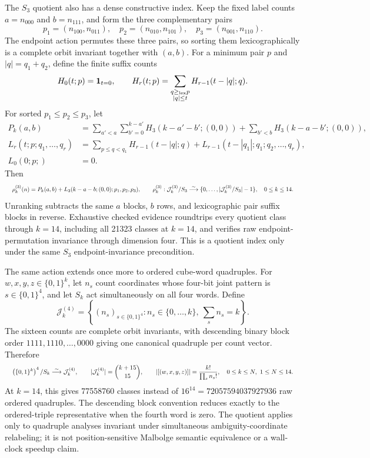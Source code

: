 \documentclass{article}
\newcommand{\fitmath}[1]{\resizebox{0.99\linewidth}{!}{$\displaystyle #1$}}
\begin{document}
The $S_3$ quotient also has a dense constructive index. Keep the fixed label
counts $a=n_{000}$ and $b=n_{111}$, and form the three complementary pairs
\[
  p_1=(n_{100},n_{011}),\quad
  p_2=(n_{010},n_{101}),\quad
  p_3=(n_{001},n_{110}).
\]
The endpoint action permutes these three pairs, so sorting them
lexicographically is a complete orbit invariant together with $(a,b)$. For a
minimum pair $p$ and $|q|=q_1+q_2$, define the finite suffix counts
\[
  H_0(t;p)=\mathbf 1_{t=0},\qquad
  H_r(t;p)=\sum_{\substack{q\geq_{\rm lex}p\\ |q|\leq t}}
    H_{r-1}(t-|q|;q).
\]
For sorted $p_1\leq p_2\leq p_3$, let
\[
  \begin{aligned}
  P_k(a,b)&=\sum_{a'<a}\sum_{b'=0}^{k-a'}H_3(k-a'-b';(0,0))
    +\sum_{b'<b}H_3(k-a-b';(0,0)),\\
  L_r(t;p;q_1,\ldots,q_r)&=
    \sum_{p\leq q<q_1}H_{r-1}(t-|q|;q)
    +L_{r-1}(t-|q_1|;q_1;q_2,\ldots,q_r),\\
  L_0(0;p;)&=0.
  \end{aligned}
\]
Then
\begin{equation}
  \fitmath{%
    \rho^{(3)}_k(n)=P_k(a,b)+L_3(k-a-b;(0,0);p_1,p_2,p_3),
    \qquad
    \rho^{(3)}_k:
      \mathcal J^{(3)}_k/S_3\overset{\sim}{\longrightarrow}
      \{0,\ldots,|\mathcal J^{(3)}_k/S_3|-1\},
    \quad 0\leq k\leq14.
  }
  \label{eq:optimization-crazy-preimage-cube-unordered-triple-ranking}
\end{equation}
Unranking subtracts the same $a$ blocks, $b$ rows, and lexicographic pair
suffix blocks in reverse. Exhaustive checked evidence roundtrips every quotient
class through $k=14$, including all 21323 classes at $k=14$, and verifies raw
endpoint-permutation invariance through dimension four. This is a quotient
index only under the same $S_3$ endpoint-invariance precondition.

The same action extends once more to ordered cube-word quadruples. For
$w,x,y,z\in\{0,1\}^k$, let $n_s$ count coordinates whose four-bit joint
pattern is $s\in\{0,1\}^4$, and let $S_k$ act simultaneously on all four
words. Define
\[
  \mathcal{J}^{(4)}_k=\left\{(n_s)_{s\in\{0,1\}^4}:
    n_s\in\{0,\ldots,k\},\ \sum_s n_s=k\right\}.
\]
The sixteen counts are complete orbit invariants, with descending binary block
order $1111,1110,\ldots,0000$ giving one canonical quadruple per count vector.
Therefore
\begin{equation}
  \fitmath{%
    \left(\{0,1\}^k\right)^4/S_k
      \overset{\sim}{\longrightarrow}\mathcal{J}^{(4)}_k,
    \qquad
    |\mathcal{J}^{(4)}_k|=\binom{k+15}{15},
    \qquad
    |[(w,x,y,z)]|=\frac{k!}{\prod_s n_s!},
    \quad 0\leq k\leq N,\ 1\leq N\leq14.
  }
  \label{eq:optimization-crazy-preimage-cube-ordered-quadruple-quotient}
\end{equation}
At $k=14$, this gives 77558760 classes instead of
$16^{14}=72057594037927936$ raw ordered quadruples. The descending block
convention reduces exactly to the ordered-triple representative when the fourth
word is zero. The quotient applies only to quadruple analyses invariant under
simultaneous ambiguity-coordinate relabeling; it is not position-sensitive
Malbolge semantic equivalence or a wall-clock speedup claim.
\end{document}
